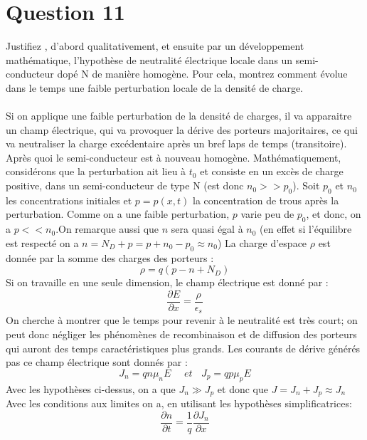 \section{Question 11}
Justifiez , d'abord qualitativement, et ensuite par un développement mathématique,
l'hypothèse de neutralité électrique locale dans un semi-conducteur dopé N de manière
homogène. Pour cela, montrez comment évolue dans le temps une faible perturbation locale de la densité de charge.
\\
\hbox{}
\\
Si on applique une faible perturbation de la densité de charges, il va apparaitre un champ électrique, qui va provoquer la dérive des porteurs majoritaires, ce qui va neutraliser la charge excédentaire après un bref laps de temps (transitoire). Après quoi le semi-conducteur est à nouveau homogène. 
Mathématiquement, considérons que la perturbation ait lieu à $t_0$ et consiste en un excès de charge positive, dans un semi-conducteur de type N (est donc $n_0>>p_0$). Soit $p_0$ et $n_0$ les concentrations initiales et $p=p(x,t)$ la concentration de trous après la perturbation. Comme on a une faible perturbation, $p$ varie peu de $p_0$, et donc, on a $p<<n_0$.On remarque aussi que $n$ sera quasi égal à $n_0$ (en effet si l'équilibre est respecté on a $n=N_D+p=p+n_0-p_0 \approx n_0$) La charge d'espace $\rho$ est donnée par la somme des charges des porteurs :
\begin{equation}
\rho =q(p-n+N_D)
\end{equation}
Si on travaille en une seule dimension, le champ électrique est donné par :
\begin{equation}
\frac{\partial E}{\partial x}=\frac{\rho}{\epsilon _s} 
\end{equation}
On cherche à montrer que le temps pour revenir à le neutralité est très court; on peut donc négliger les phénomènes de recombinaison et de diffusion des porteurs qui auront des temps caractéristiques plus grands. Les courants de dérive générés pas ce champ électrique sont donnés par :
\begin{equation}
J_n=qn\mu _n E~~~~~~ et ~~~~ J_p=qp\mu _p E 
\end{equation}
Avec les hypothèses ci-dessus, on a que $J_n \gg J_p$ et donc que $J=J_n+J_p \approx J_n$\\
Avec les conditions aux limites on a, en utilisant les hypothèses simplificatrices:
\begin{equation}
\frac{\partial n}{\partial t}=\frac{1}{q}\frac{\partial J_n}{\partial x}
\end{equation} 
